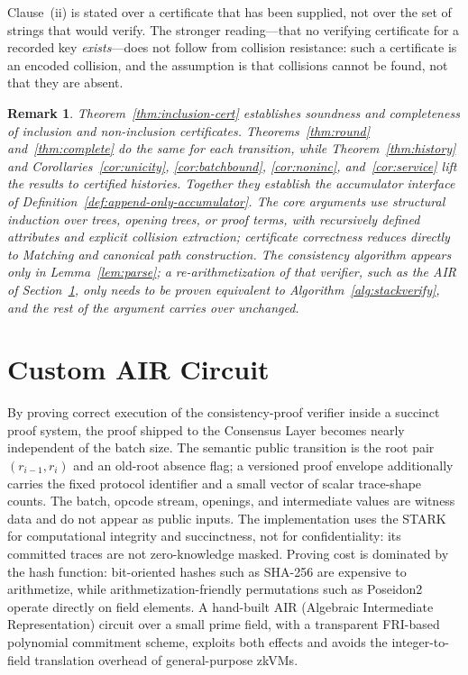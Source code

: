 \documentclass[twocolumn]{article}
\newtheorem{remark}{Remark}
\begin{document}
Clause~(ii) is stated over a certificate that has been supplied, not over the set of strings that would verify. The stronger reading---that no verifying certificate for a recorded key \emph{exists}---does not follow from collision resistance: such a certificate is an encoded collision, and the assumption is that collisions cannot be found, not that they are absent.

\begin{remark}
Theorem~\ref{thm:inclusion-cert} establishes soundness and completeness of inclusion and non-inclusion certificates. Theorems~\ref{thm:round} and~\ref{thm:complete} do the same for each transition, while Theorem~\ref{thm:history} and Corollaries~\ref{cor:unicity}, \ref{cor:batchbound}, \ref{cor:noninc}, and~\ref{cor:service} lift the results to certified histories. Together they establish the accumulator interface of Definition~\ref{def:append-only-accumulator}. The core arguments use structural induction over trees, opening trees, or proof terms, with recursively defined attributes and explicit collision extraction; certificate correctness reduces directly to Matching and canonical path construction. The consistency algorithm appears only in Lemma~\ref{lem:parse}; a re-arithmetization of that verifier, such as the AIR of Section~\ref{sec:custom-air-circuit}, only needs to be proven equivalent to Algorithm~\ref{alg:stackverify}, and the rest of the argument carries over unchanged.
\end{remark}


\section{Custom AIR Circuit}
\label{sec:custom-air-circuit}

By proving correct execution of the consistency-proof verifier inside a succinct proof system, the proof shipped to the Consensus Layer becomes nearly independent of the batch size. The semantic public transition is the root pair $(r_{i-1}, r_i)$ and an old-root absence flag; a versioned proof envelope additionally carries the fixed protocol identifier and a small vector of scalar trace-shape counts. The batch, opcode stream, openings, and intermediate values are witness data and do not appear as public inputs. The implementation uses the STARK for computational integrity and succinctness, not for confidentiality: its committed traces are not zero-knowledge masked. Proving cost is dominated by the hash function: bit-oriented hashes such as SHA-256 are expensive to arithmetize, while arithmetization-friendly permutations such as Poseidon2 operate directly on field elements. A hand-built AIR (Algebraic Intermediate Representation) circuit over a small prime field, with a transparent FRI-based polynomial commitment scheme, exploits both effects and avoids the integer-to-field translation overhead of general-purpose zkVMs.
\end{document}
